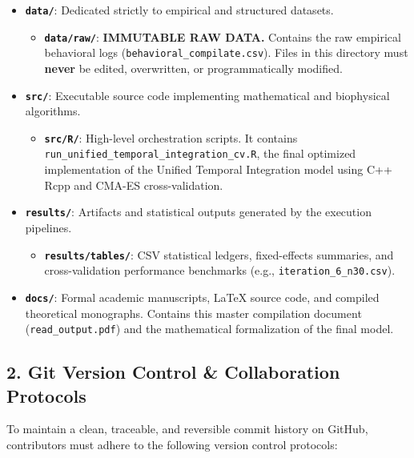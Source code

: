 \documentclass[11pt,twoside,a4paper]{article}
\begin{document}
\begin{itemize}
    \item \textbf{\texttt{data/}}: Dedicated strictly to empirical and structured datasets.
    \begin{itemize}
        \item \textbf{\texttt{data/raw/}}: \textbf{IMMUTABLE RAW DATA.} Contains the raw empirical behavioral logs (\texttt{behavioral\_compilate.csv}). Files in this directory must \textbf{never} be edited, overwritten, or programmatically modified.
    \end{itemize}
    
    \item \textbf{\texttt{src/}}: Executable source code implementing mathematical and biophysical algorithms.
    \begin{itemize}
        \item \textbf{\texttt{src/R/}}: High-level orchestration scripts. It contains \texttt{run\_unified\_temporal\_integration\_cv.R}, the final optimized implementation of the Unified Temporal Integration model using C++ Rcpp and CMA-ES cross-validation.
    \end{itemize}
    
    \item \textbf{\texttt{results/}}: Artifacts and statistical outputs generated by the execution pipelines.
    \begin{itemize}
        \item \textbf{\texttt{results/tables/}}: CSV statistical ledgers, fixed-effects summaries, and cross-validation performance benchmarks (e.g., \texttt{iteration\_6\_n30.csv}).
    \end{itemize}
    
    \item \textbf{\texttt{docs/}}: Formal academic manuscripts, LaTeX source code, and compiled theoretical monographs. Contains this master compilation document (\texttt{read\_output.pdf}) and the mathematical formalization of the final model.
\end{itemize}

\subsection{2. Git Version Control \& Collaboration Protocols}

To maintain a clean, traceable, and reversible commit history on GitHub, contributors must adhere to the following version control protocols:
\end{document}
